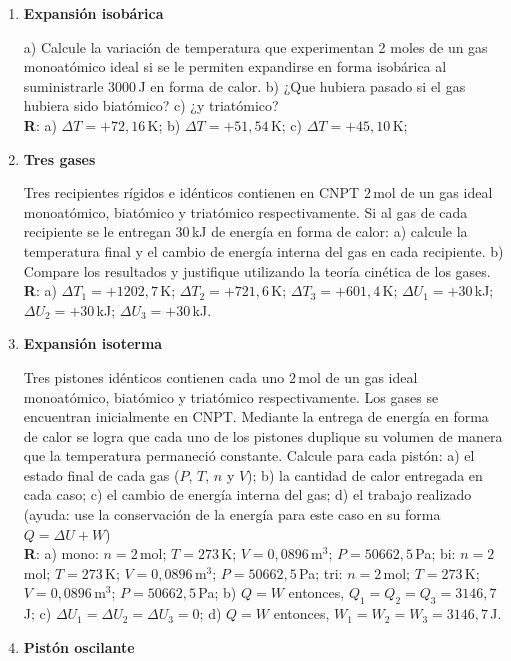 \documentclass[a4paper,12pt]{article}
\begin{document}
\begin{enumerate}
	\item {\bf{Expansión isobárica}}
		
		a) Calcule la variación de temperatura que experimentan 2 moles de un
		gas monoatómico ideal si se le permiten expandirse en forma isobárica
		al suministrarle $3000$\,J en forma de calor. b) ¿Que hubiera pasado si
		el gas hubiera sido biatómico? c) ¿y triatómico?
		\\{\bf R}: a) $\Delta T = +72,16$\,K; b) $\Delta T = +51,54$\,K; c)
		$\Delta T = +45,10$\,K;

	\item {\bf{Tres gases}}

		Tres recipientes rígidos e idénticos contienen en CNPT $2$\,mol de un gas ideal
		monoatómico, biatómico y triatómico respectivamente. Si al gas de cada
		recipiente se le entregan $30$\,kJ de energía en forma de calor: a)
		calcule la temperatura final y el cambio de energía interna del gas en
		cada recipiente. b) Compare los resultados y justifique utilizando la
		teoría cinética de los gases.  
		\\{\bf R}: a) $\Delta T_1 = +1202,7$\,K; $\Delta T_2 = +721,6$\,K;
		$\Delta T_3 = +601,4$\,K; $\Delta U_1 = +30$\,kJ; $\Delta U_2 =
		+30$\,kJ; $\Delta U_3 = +30$\,kJ.

	\item {\bf{Expansión isoterma}}

		Tres pistones idénticos contienen cada uno $2$\,mol de un gas ideal
		monoatómico, biatómico y triatómico respectivamente. Los gases se
		encuentran inicialmente en CNPT. Mediante la entrega de energía en
		forma de calor se logra que cada uno de los pistones duplique su
		volumen de manera que la temperatura permaneció constante. Calcule para
		cada pistón: a) el estado final de cada gas ($P$, $T$, $n$ y $V$); b)
		la cantidad de calor entregada en cada caso; c) el cambio de energía
		interna del gas; d) el trabajo realizado (ayuda: use la conservación de
		la energía para este caso en su forma $Q=\Delta U + W$) 
		\\{\bf R}: a) mono: $n=2$\,mol; $T=273$\,K; $V=0,0896$\,m$^3$;
		$P=50662,5$\,Pa; bi: $n=2$\,mol; $T=273$\,K; $V=0,0896$\,m$^3$;
		$P=50662,5$\,Pa; tri: $n=2$\,mol; $T=273$\,K; $V=0,0896$\,m$^3$;
		$P=50662,5$\,Pa; b) $Q=W$ entonces, $Q_1 = Q_2 = Q_3 = 3146,7$\,J; c)
		$\Delta U_1 = \Delta U_2 = \Delta U_3 = 0$; d) $Q=W$ entonces, $W_1 =
		W_2 = W_3 = 3146,7$\,J.

	\item {\bf{Pistón oscilante}}


\end{enumerate}
\end{document}
